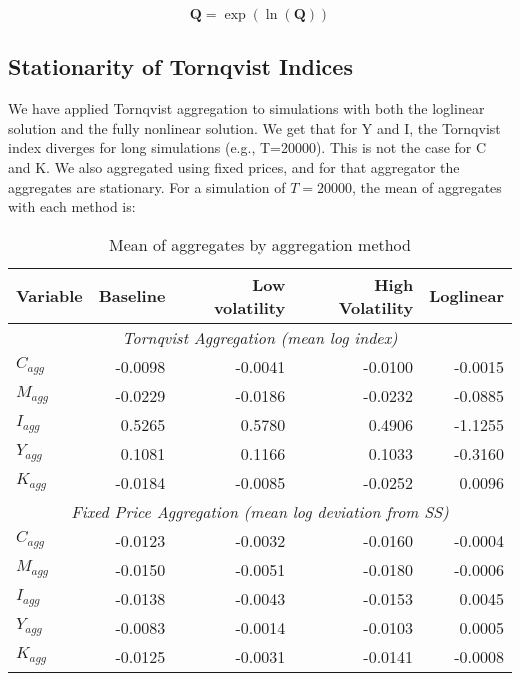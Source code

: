 \documentclass[12pt,english]{article}
\begin{document}
$$\mathbf{Q} = \exp(\ln(\mathbf{Q}))$$

\subsection{Stationarity of Tornqvist Indices}

We have applied Tornqvist aggregation to simulations with both the loglinear solution and the fully nonlinear solution. We get that for Y and I, the Tornqvist index diverges for long simulations (e.g., T=20000). This is not the case for C and K. We also aggregated using fixed prices, and for that aggregator the aggregates are stationary. For a simulation of $T=20000$, the mean of aggregates with each method is:

\begin{table}[h]
\label{tab:aggregation_methods}
\centering
\caption{Mean of aggregates by aggregation method}
\begin{tabular}{lrrrr}
\hline
\textbf{Variable} & \textbf{Baseline} & \textbf{Low volatility} & \textbf{High Volatility} & \textbf{Loglinear} \\
\hline 
\multicolumn{5}{c}{\textit{Tornqvist Aggregation (mean log index)}} \\[0.5ex]
$C_{agg}$ & -0.0098 & -0.0041 & -0.0100 & -0.0015 \\[0.5ex]
$M_{agg}$ & -0.0229 & -0.0186 & -0.0232 & -0.0885 \\[0.5ex]
$I_{agg}$ & 0.5265 & 0.5780 & 0.4906 & -1.1255 \\[0.5ex]
$Y_{agg}$ & 0.1081 & 0.1166 & 0.1033 & -0.3160 \\[0.5ex]
$K_{agg}$ & -0.0184 & -0.0085 & -0.0252 & 0.0096 \\[1ex]
\hline 
\multicolumn{5}{c}{\textit{Fixed Price Aggregation (mean log deviation from SS)}} \\[0.5ex]
$C_{agg}$ & -0.0123 & -0.0032 & -0.0160 & -0.0004 \\[0.5ex]
$M_{agg}$ & -0.0150 & -0.0051 & -0.0180 & -0.0006 \\[0.5ex]
$I_{agg}$ & -0.0138 & -0.0043 & -0.0153 & 0.0045 \\[0.5ex]
$Y_{agg}$ & -0.0083 & -0.0014 & -0.0103 & 0.0005 \\[0.5ex]
$K_{agg}$ & -0.0125 & -0.0031 & -0.0141 & -0.0008 \\
\hline
\end{tabular}

\footnotesize{}
\end{table}
\end{document}
